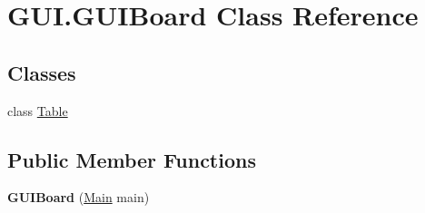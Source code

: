 \hypertarget{class_g_u_i_1_1_g_u_i_board}{}\section{G\+U\+I.\+G\+U\+I\+Board Class Reference}
\label{class_g_u_i_1_1_g_u_i_board}
\subsection*{Classes}
\begin{DoxyCompactItemize}
\item 
class \mbox{\hyperlink{class_g_u_i_1_1_g_u_i_board_1_1_table}{Table}}
\end{DoxyCompactItemize}
\subsection*{Public Member Functions}
\begin{DoxyCompactItemize}
\item 
\mbox{\label{class_g_u_i_1_1_g_u_i_board_a1120e559dc54adc2935d4e342dafc1f6}} 
{\bfseries G\+U\+I\+Board} (\mbox{\hyperlink{class_g_u_i_1_1_main}{Main}} main)
\end{DoxyCompactItemize}
